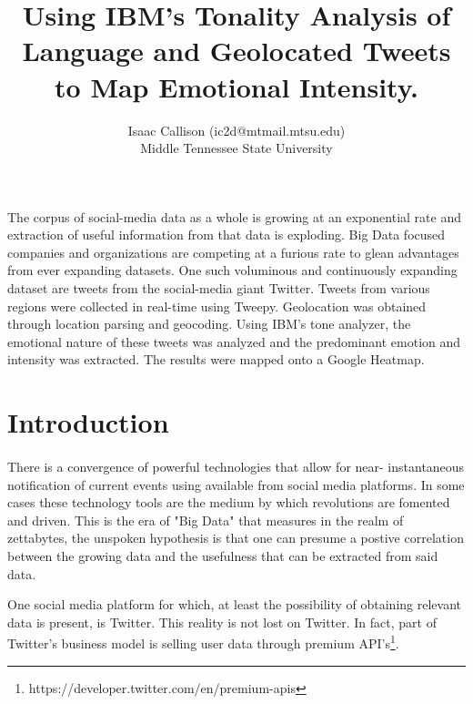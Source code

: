 \documentclass[12pt, oneside]{article}
\title{Using IBM's Tonality Analysis of Language and Geolocated Tweets to Map Emotional Intensity.
\\\medskip}
\author{Isaac Callison (ic2d@mtmail.mtsu.edu)\\Middle Tennessee State University}
\begin{document}
\maketitle
\nocite{*}
\newpage{}


\renewenvironment{abstract}
 {\small
  \begin{center}
  \bfseries \abstractname\vspace{-.5em}\vspace{0pt}
  \end{center}
  \list{}{
    \setlength{\leftmargin}{.8cm}%
    \setlength{\rightmargin}{\leftmargin}%
  }%
  \item\relax}
 {\endlist}

\begin{abstract}
The corpus of social-media data as a whole is growing at an exponential rate
and extraction of useful information from that data is exploding.
Big Data focused companies and organizations are competing at a furious rate to
glean advantages from ever expanding datasets. One such voluminous and
continuously expanding dataset are tweets from the social-media giant Twitter.
Tweets from various regions were collected in real-time using Tweepy.
Geolocation was obtained through location parsing and geocoding. Using IBM's
tone analyzer, the emotional nature of these tweets was analyzed and the
predominant emotion and intensity was extracted. The results were mapped onto a
Google Heatmap.
\end{abstract}

\section{Introduction}
\paragraph{}
There is a convergence of powerful technologies that allow for near-
instantaneous notification of current events using available from
social media platforms. In some cases these technology tools are the medium by
which revolutions are fomented and driven\cite{arab}. This is the era of "Big
Data" that measures in the realm of zettabytes, the unspoken hypothesis is that
one can presume a postive correlation between the growing data and the
usefulness that can be extracted from said data\cite{villars2011}.

One social media platform for which, at least the possibility of obtaining
relevant data is present, is Twitter. This reality is not lost
on Twitter. In fact, part of Twitter's business model is selling user data
through premium API's\footnote{https://developer.twitter.com/en/premium-apis}.
\end{document}
